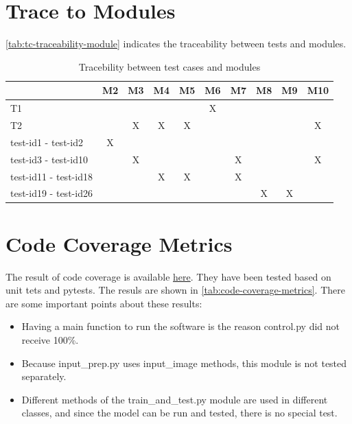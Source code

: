 \documentclass[12pt, titlepage]{article}
\begin{document}
\section{Trace to Modules}	
\autoref{tab:tc-traceability-module} indicates the traceability between tests and modules.
\begin{table}[h!]
  \begin{center}
  \begin{tabular}{ |l|c|c|c|c|c|c|c|c|c| }
  \hline
   & M2 & M3 & M4 & M5 & M6 & M7 & M8 & M9 & M10\\
  \hline
  T1 & & & & & X & & & &\\
  \hline
  T2 & & X & X & X & & & & & X\\
  \hline
  test-id1 - test-id2 & X & & & & & & & &\\
  \hline
  test-id3 - test-id10 & & X & & & & X & & & X\\
  \hline
  test-id11 - test-id18 & & & X & X & & X & & &\\
  \hline
  test-id19 - test-id26 & & & & & & & X & X &\\
  
  \hline
  \end{tabular}
  \caption{Tracebility between test cases and modules}
  \label{tab:tc-traceability-module}
  \end{center}
  \end{table}

\section{Code Coverage Metrics}

The result of code coverage is available 
\href{https://github.com/tanya-jp/ANN-CAS741/tree/main/test/htmlcov}{here}.
They have been tested based on unit tets and pytests.
The resuls are shown in \autoref{tab:code-coverage-metrics}. 
There are some important points about these results:

\begin{itemize}
  \item Having a main function to run the software is the reason control.py did not receive 100\%. 
  \item Because input\_prep.py uses input\_image methods, this module is not tested separately.
  \item Different methods of the train\_and\_test.py module are used in different 
  classes, and since the model can be run and tested, there is no special test.
\end{itemize}
\end{document}
